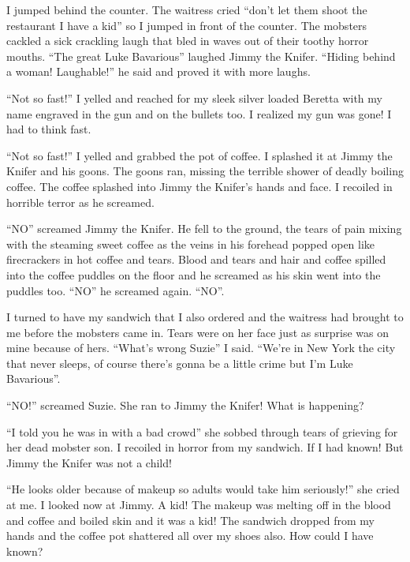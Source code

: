 I jumped behind the counter. The waitress cried ``don't let them
shoot the restaurant I have a kid'' so I jumped in front of the
counter. The mobsters cackled a sick crackling laugh that bled in
waves out of their toothy horror mouths. ``The great Luke Bavarious''
laughed Jimmy the Knifer. ``Hiding behind a woman! Laughable!'' he
said and proved it with more laughs.



``Not so fast!'' I yelled and reached for my sleek silver loaded
Beretta with my name engraved in the gun and on the bullets too. I
realized my gun was gone! I had to think fast.



``Not so fast!'' I yelled and grabbed the pot of coffee. I splashed
it at Jimmy the Knifer and his goons. The goons ran, missing the
terrible shower of deadly boiling coffee. The coffee splashed into
Jimmy the Knifer's hands and face. I recoiled in horrible terror as
he screamed.



``NO'' screamed Jimmy the Knifer. He fell to the ground, the tears of
pain mixing with the steaming sweet coffee as the veins in his
forehead popped open like firecrackers in hot coffee and tears.
Blood and tears and hair and coffee spilled into the coffee puddles
on the floor and he screamed as his skin went into the puddles too.
``NO'' he screamed again. ``NO''.



I turned to have my sandwich that I also ordered and the waitress
had brought to me before the mobsters came in. Tears were on her
face just as surprise was on mine because of hers. ``What's wrong
Suzie'' I said. ``We're in New York the city that never sleeps, of
course there's gonna be a little crime but I'm Luke
Bavarious''.



``NO!'' screamed Suzie. She ran to Jimmy the Knifer! What is
happening?



``I told you he was in with a bad crowd'' she sobbed through tears of
grieving for her dead mobster son. I recoiled in horror from my
sandwich. If I had known! But Jimmy the Knifer was not a
child!



``He looks older because of makeup so adults would take him
seriously!'' she cried at me. I looked now at Jimmy. A kid! The
makeup was melting off in the blood and coffee and boiled skin and
it was a kid! The sandwich dropped from my hands and the coffee pot
shattered all over my shoes also. How could I have known?



